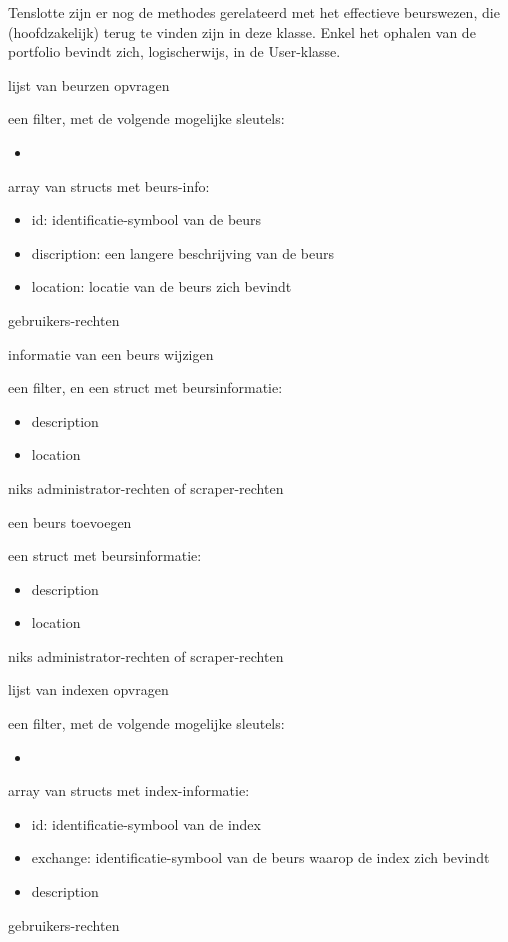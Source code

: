Tenslotte zijn er nog de methodes gerelateerd met het effectieve beurswezen, die (hoofdzakelijk) terug te vinden zijn in deze klasse. Enkel het ophalen van de portfolio bevindt zich, logischerwijs, in de User-klasse.

	{ lijst van beurzen opvragen }
	{ een filter, met de volgende mogelijke sleutels:
		\begin{itemize}
		\item{}
		\end{itemize} }
	{ array van structs met beurs-info:
		\begin{itemize}
		\item{id: identificatie-symbool van de beurs}
		\item{discription: een langere beschrijving van de beurs}
		\item{location: locatie van de beurs zich bevindt}
		\end{itemize} }
	{ gebruikers-rechten }

	{ informatie van een beurs wijzigen }
	{ een filter, en een struct met beursinformatie:
		\begin{itemize}
		\item{description}
		\item{location}
		\end{itemize} }
	{ niks }
	{ administrator-rechten of scraper-rechten }

	{ een beurs toevoegen }
	{ een struct met beursinformatie:
		\begin{itemize}
		\item{description}
		\item{location}
		\end{itemize} }
	{ niks }
	{ administrator-rechten of scraper-rechten }

	{ lijst van indexen opvragen }
	{ een filter, met de volgende mogelijke sleutels:
		\begin{itemize}
		\item{}
		\end{itemize} }
	{ array van structs met index-informatie:
		\begin{itemize}
		\item{id: identificatie-symbool van de index}
		\item{exchange: identificatie-symbool van de beurs waarop de index zich bevindt}
		\item{description}
		\end{itemize} }
	{ gebruikers-rechten }

